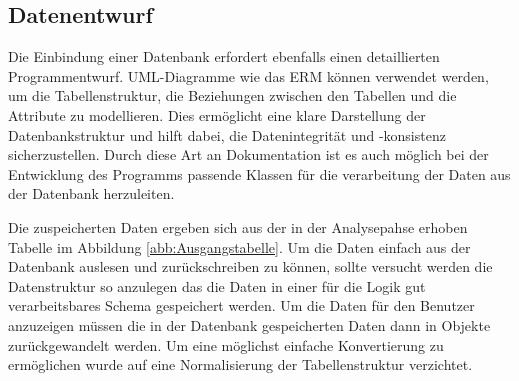 \subsection{Datenentwurf}
\label{sec:Datenentwurf}
Die Einbindung einer Datenbank erfordert ebenfalls einen detaillierten Programmentwurf. UML-Diagramme wie das ERM können verwendet werden, um die Tabellenstruktur, die Beziehungen zwischen den Tabellen und die Attribute zu modellieren. Dies ermöglicht eine klare Darstellung der Datenbankstruktur und hilft dabei, die Datenintegrität und -konsistenz sicherzustellen. Durch diese Art an Dokumentation ist es auch möglich bei der Entwicklung des Programms passende Klassen für die verarbeitung der Daten aus der Datenbank herzuleiten.

Die zuspeicherten Daten ergeben sich aus der in der Analysepahse erhoben Tabelle im Abbildung \ref{abb:Ausgangstabelle}. Um die Daten einfach aus der Datenbank auslesen und zurückschreiben zu können, sollte versucht werden die Datenstruktur so anzulegen das die Daten in einer für die Logik gut verarbeitsbares Schema gespeichert werden. Um die Daten für den Benutzer anzuzeigen müssen die in der Datenbank gespeicherten Daten dann in Objekte zurückgewandelt werden. Um eine möglichst einfache Konvertierung zu ermöglichen wurde auf eine Normalisierung der Tabellenstruktur verzichtet.

